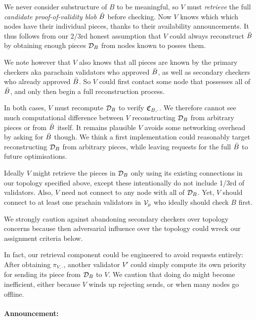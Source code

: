 We never consider substructure of $B$ to be meaningful, so $V$ must {\em retrieve} the full {\em candidate proof-of-validity blob} $\bar{B}$ before checking.  Now $V$ knows which which nodes have their individual pieces, thanks to their availability announcements.  It thus follows from our 2/3rd honest assumption that $V$ could always reconstruct $\bar{B}$ by obtaining enough pieces $\mathcal{D}_B$ from nodes known to posses them.  

We note however that $V$ also knows that all pieces are known by the primary checkers aka parachain validators who approved $\bar{B}$, as well as secondary checkers who already approved $\bar{B}$.  So $V$ could first contact some node that possesses all of $\bar{B}$, and only then begin a full reconstruction process. 

In both cases, $V$ must recompute $\mathcal{D}_B$ to verify $\mathfrak{C}_{B,\cdot}$.  We therefore cannot see much computational difference between $V$ reconstructing $\mathcal{D}_B$ from arbitrary pieces or from $\bar{B}$ itself.  It remains plausible $V$ avoids some networking overhead by asking for $\bar{B}$ though.  We think a first implementation could reasonably target reconstructing $\mathcal{D}_B$ from arbitrary pieces, while leaving requests for the full $\bar{B}$ to future optimisations. 

Ideally $V$ might retrieve the pieces in $\mathcal{D}_B$ only using its existing connections in our topology specified above, except these intentionally do not include 1/3rd of validators.  Also, $V$ need not connect to any node with all of $\mathcal{D}_B$.  Yet, $V$ should connect to at least one prachain validators in $\mathcal{V}_\rho$ who ideally should check $B$ first.  

We strongly caution against abandoning secondary checkers over topology concerns because then adversarial influence over the topology could wreck our assignment criteria below.

In fact, our retrieval component could be engineered to avoid requests entirely:  After obtaining $\pi_{V,\cdot}$, another validator $V'$ could simply compute its own priority for sending its piece from $\mathcal{D}_B$ to $V$.  We caution that doing do might become inefficient, either because $V$ winds up rejecting sends, or when many nodes go offline.  

\smallskip
\paragraph{Announcement:}

